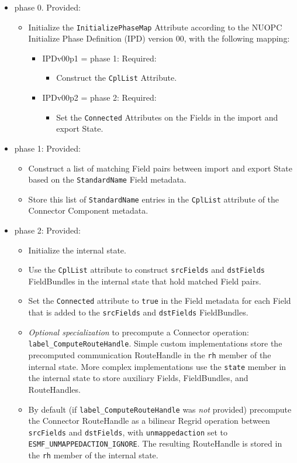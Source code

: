 \begin{itemize}
\item phase 0. {\sc Provided:}
  \begin{itemize}
  \item Initialize the {\tt InitializePhaseMap} Attribute according to the NUOPC Initialize Phase Definition (IPD) version 00, with the following mapping:
    \begin{itemize}
    \item IPDv00p1 = phase 1: {\sc Required:} 
      \begin{itemize}
      \item Construct the {\tt CplList} Attribute.
      \end{itemize}
    \item IPDv00p2 = phase 2: {\sc Required:}
      \begin{itemize}
      \item Set the {\tt Connected} Attributes on the Fields in the import and export State.
      \end{itemize}  
    \end{itemize}  
  \end{itemize}  
\item phase 1: {\sc Provided:} 
  \begin{itemize}
  \item Construct a list of matching Field pairs between import and export State based on the {\tt StandardName} Field metadata. 
  \item Store this list of {\tt StandardName} entries in the {\tt CplList} attribute of the Connector Component metadata.
  \end{itemize}
\item phase 2: {\sc Provided:}
  \begin{itemize}
  \item Initialize the internal state.
  \item Use the {\tt CplList} attribute to construct {\tt srcFields} and {\tt dstFields} FieldBundles in the internal state that hold matched Field pairs.
  \item Set the {\tt Connected} attribute to {\tt true} in the Field metadata for each Field that is added to the {\tt srcFields} and {\tt dstFields} FieldBundles.
  \item {\it Optional specialization} to precompute a Connector operation: {\tt label\_ComputeRouteHandle}. Simple custom implementations store the precomputed communication RouteHandle in the {\tt rh} member of the internal state. More complex implementations use the {\tt state} member in the internal state to store auxiliary Fields, FieldBundles, and RouteHandles.
  \item By default (if {\tt label\_ComputeRouteHandle} was {\em not} provided) precompute the Connector RouteHandle as a bilinear Regrid operation between {\tt srcFields} and {\tt dstFields}, with {\tt unmappedaction} set to {\tt ESMF\_UNMAPPEDACTION\_IGNORE}. The resulting RouteHandle is stored in the {\tt rh} member of the internal state.
  \end{itemize}  
\end{itemize}

